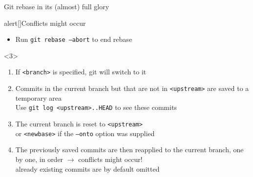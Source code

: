 \documentclass[usenames,svgnames,14pt]{beamer}
\newcommand{\then}{\raisebox{2pt}{$\;\drsh\;$}}
\begin{document}
\begin{frame}[fragile]{Git rebase in its (almost) full glory}
\begin{overlayarea}{\textwidth}{0.5\textheight}
\begin{onlyenv}
\begin{varblock*}{alert}[\textwidth]{Conflicts might occur}
\begin{overlayarea}{\textwidth}{0.12\textheight}
\begin{onlyenv}
\begin{itemize}
                            \item Run \;\texttt{git rebase --abort}\; to end rebase
                        \end{itemize}
                    \end{onlyenv}
                \end{overlayarea}
            \end{varblock*}
        \end{onlyenv}
        \begin{onlyenv}<3>
            \newcommand{\opt}[1]{\;\textcolor{environment-color}{\texttt{#1}}\;}
            \begin{enumerate}
                \item If \opt{<branch>} is specified, git will switch to it%
                \item Commits in the current branch but that are not in \opt{<upstream>} are saved to a temporary area\\
                      {\footnotesize\then Use \;\texttt{git log <upstream>..HEAD}\; to see these commits}
                \item The current branch is reset to \opt{<upstream>}\\
                      {\footnotesize\then or \opt{<newbase>} if the \opt{--onto} option was supplied}
                \item The previously saved commits are then reapplied to the current branch, one by one, in order
                      $\to$ \alert{conflicts might occur!}\\
                      {\footnotesize\then already existing commits are by default omitted}
            \end{enumerate}
        \end{onlyenv}
    \end{overlayarea}
\end{frame}
\end{document}
